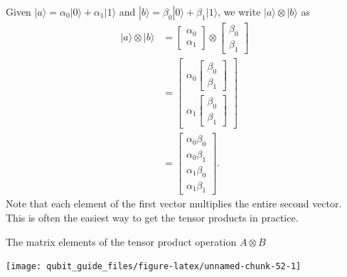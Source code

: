\documentclass[fleqn,a4paper]{article}
\theoremstyle{definition}
\theoremstyle{definition}
\theoremstyle{definition}
\theoremstyle{definition}
\theoremstyle{remark}
\begin{document}
Given \(|a\rangle = \alpha_0|0\rangle + \alpha_1|1\rangle\) and \(|b\rangle = \beta_0|0\rangle +\beta_1|1\rangle\), we write \(|a\rangle\otimes|b\rangle\) as
\[
  \begin{aligned}
    |a\rangle\otimes|b\rangle
    &= \begin{bmatrix}\alpha_0\\\alpha_1\end{bmatrix} \otimes \begin{bmatrix}\beta_0\\\beta_1\end{bmatrix}
  \\&= \begin{bmatrix}\alpha_0\begin{bmatrix}\beta_0\\\beta_1\end{bmatrix}\\\alpha_1\begin{bmatrix}\beta_0\\\beta_1\end{bmatrix}\end{bmatrix}
  \\&= \begin{bmatrix}\alpha_0\beta_0\\\alpha_0\beta_1\\\alpha_1\beta_0\\\alpha_1\beta_1\end{bmatrix}.
  \end{aligned}
\]
Note that each element of the first vector multiplies the entire second vector.
This is often the easiest way to get the tensor products in practice.

The matrix elements of the tensor product operation \(A\otimes B\)

\begin{center}\texttt{[image: qubit\_guide\_files/figure-latex/unnamed-chunk-52-1]} \end{center}
\end{document}
